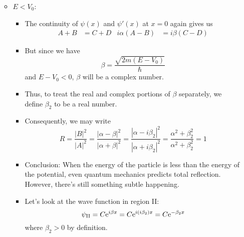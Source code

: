 \documentclass[../notes.tex]{subfiles}
\begin{document}
\begin{itemize}
\begin{itemize}
\begin{itemize}
\begin{equation*}
            \end{equation*}
        \end{itemize}
        \item $E<V_0$:
        \begin{itemize}
            \item The continuity of $\psi(x)$ and $\psi'(x)$ at $x=0$ again gives us
            \begin{align*}
                A+B &= C+D&
                i\alpha(A-B) &= i\beta(C-D)
            \end{align*}
            \item But since we have
            \begin{equation*}
                \beta = \frac{\sqrt{2m(E-V_0)}}{\hbar}
            \end{equation*}
            and $E-V_0<0$, $\beta$ will be a complex number.
            \item Thus, to treat the real and complex portions of $\beta$ separately, we define $\beta_2$ to be a real number.
            \item Consequently, we may write
            \begin{equation*}
                R = \frac{|B|^2}{|A|^2} = \frac{|\alpha-\beta|^2}{|\alpha+\beta|^2} = \frac{|\alpha-i\beta_2|^2}{|\alpha+i\beta_2|^2} = \frac{\alpha^2+\beta_2^2}{\alpha^2+\beta_2^2} = 1
            \end{equation*}
            \item Conclusion: When the energy of the particle is less than the energy of the potential, even quantum mechanics predicts total reflection. However, there's still something subtle happening.
            \item Let's look at the wave function in region II:
            \begin{equation*}
                \psi_\text{II} = C\e[i\beta x] = C\e[i(i\beta_2)x] = C\e[-\beta_2x]
            \end{equation*}
            where $\beta_2>0$ by definition.
            \begin{figure}[H]
                \centering
\end{figure}
\end{itemize}
\end{itemize}
\end{itemize}
\end{document}
